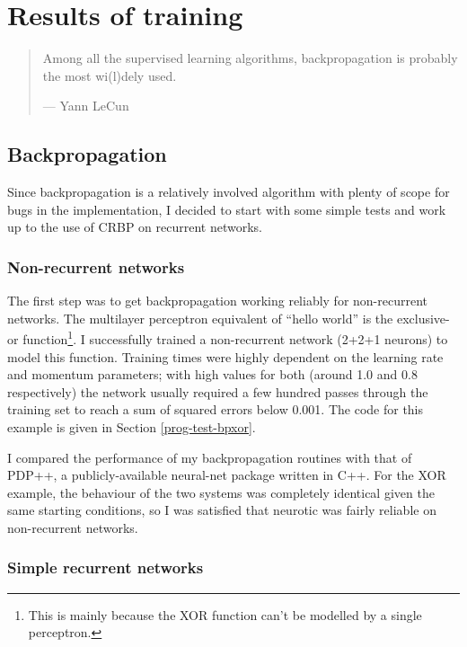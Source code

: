 \documentclass[a4paper]{report}
\newcommand{\code}[1]{{\ttfamily #1}}
\begin{document}
\chapter{Results of training}

\begin{quote}
  Among all the supervised learning algorithms, backpropagation is
  probably the most wi(l)dely used.
  
  {\hspace{5cm}--- Yann LeCun}
\end{quote}

\section{Backpropagation}
\label{results-bp}

Since backpropagation is a relatively involved algorithm with plenty
of scope for bugs in the implementation, I decided to start with some
simple tests and work up to the use of CRBP on recurrent networks.

\subsection{Non-recurrent networks}

The first step was to get backpropagation working reliably for
non-recurrent networks. The multilayer perceptron equivalent of
``hello world'' is the exclusive-or function\footnote{This is mainly
  because the XOR function can't be modelled by a single perceptron.}.
I successfully trained a non-recurrent network (2+2+1 neurons) to
model this function. Training times were highly dependent on the
learning rate and momentum parameters; with high values for both
(around 1.0 and 0.8 respectively) the network usually required a few
hundred passes through the training set to reach a sum of squared
errors below 0.001. The code for this example is given in Section
\ref{prog-test-bpxor}.

I compared the performance of my backpropagation routines with that of
PDP++, a publicly-available neural-net package written in C++. For the
XOR example, the behaviour of the two systems was completely identical
given the same starting conditions, so I was satisfied that
\code{neurotic} was fairly reliable on non-recurrent networks.

\subsection{Simple recurrent networks}
\end{document}
